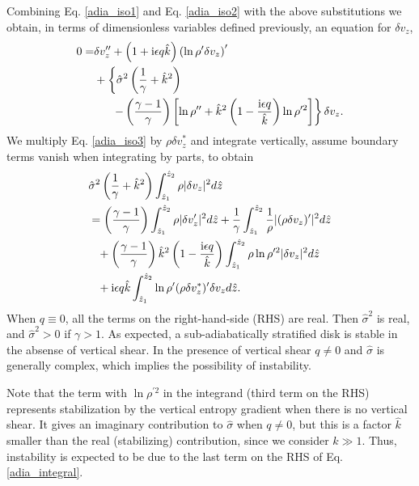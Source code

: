 Combining Eq. \ref{adia_iso1} and Eq. \ref{adia_iso2} with the above
substitutions we obtain, in terms of dimensionless variables defined previously, an equation for $\delta v_z$,
\begin{align}
  0 =& \delta v_z^{\prime\prime} + \left(1 + \mathrm{i} \epsilon q
    \hat{k}\right)\left(\ln\rho^{\prime}\delta v_z\right)^\prime\notag\\
  &+\left\{\hat{\sigma}^2\left(\frac{1}{\gamma}+\hat{k}^2\right)\right.\notag\\
  &\phantom{0=}\left.-\left(\frac{\gamma-1}{\gamma}\right)\left[\ln\rho^{\prime\prime}+\hat{k}^2\left(1-\frac{\mathrm{i}\epsilon
          q}{\hat{k}}\right)\ln\rho^{\prime 2}\right]\right\}\delta v_z.\label{adia_iso3}
\end{align}
We multiply Eq. \ref{adia_iso3} by $\rho\delta v_z^*$ and
integrate vertically, assume boundary terms vanish when integrating by
parts, to obtain
\begin{align}
  &\hat{\sigma}^2\left(\frac{1}{\gamma} +
    \hat{k}^2\right)\int_{\hat{z}_1}^{\hat{z}_2}\rho|\delta
  v_z|^2 d\hat{z} \notag\\
  &=  \left(\frac{\gamma-1}{\gamma}\right)
  \int_{\hat{z}_1}^{\hat{z}_2}\rho|\delta v_z^\prime|^2 d\hat{z}
  +\frac{1}{\gamma}\int_{\hat{z}_1}^{\hat{z}_2}\frac{1}{\rho}|(\rho\delta
  v_z)^\prime|^2 d\hat{z}\notag\\
  &\phantom{=} +
  \left(\frac{\gamma-1}{\gamma}\right)\hat{k}^2\left(1-\frac{\mathrm{i}\epsilon
      q}{\hat{k}}\right) \int_{\hat{z}_1}^{\hat{z}_2}\rho\ln\rho^{\prime
    2}|\delta v_z|^2 d\hat{z}\notag\\
  &\phantom{=} + \mathrm{i}\epsilon q \hat{k}
  \int_{\hat{z}_1}^{\hat{z}_2}\ln\rho^\prime(\rho\delta v_z^*)^\prime
  \delta v_z d\hat{z}.\label{adia_integral}
\end{align}
When $q\equiv0$, all the terms on the right-hand-side (RHS) are real. Then
$\hat{\sigma}^2$ is real, and  $\hat{\sigma}^2>0$ if $\gamma>1$. As
expected, a sub-adiabatically stratified disk is stable in the absense
of vertical shear. In the presence of vertical shear $q\neq0$ and
$\hat{\sigma}$ is generally complex, which implies the possibility of
instability.  

Note that the term with $\ln\rho^{\prime 2}$ in the integrand (third
term on the RHS) represents stabilization by the vertical entropy
gradient when there is no vertical shear. It gives an imaginary
contribution to $\hat{\sigma}$ when $q\neq0$, but this is a factor
$\hat{k}$ smaller than the real (stabilizing) contribution, since we
consider $\hat{k}\gg1$. Thus, instability is expected to be due to the
last term on the RHS of Eq. \ref{adia_integral}. 
  
